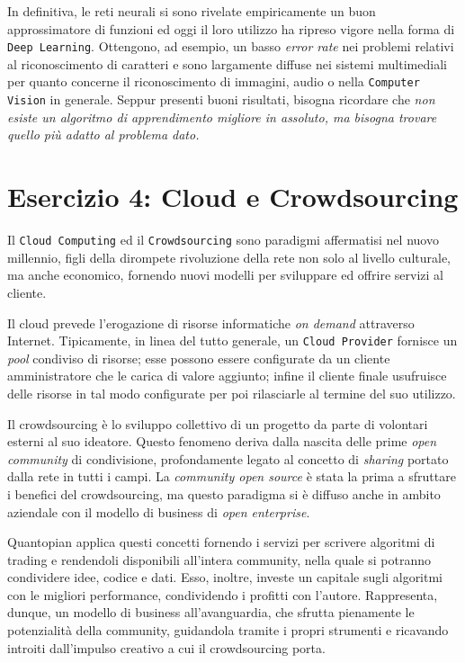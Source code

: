 			In definitiva, le reti neurali si sono rivelate empiricamente un buon approssimatore di funzioni ed oggi il loro utilizzo ha ripreso vigore nella forma di \texttt{Deep Learning}. Ottengono, ad esempio, un basso \emph{error rate} nei problemi relativi al riconoscimento di caratteri e sono largamente diffuse nei sistemi multimediali per quanto concerne il riconoscimento di immagini, audio o nella \texttt{Computer Vision} in generale. Seppur presenti buoni risultati, bisogna ricordare che \emph{non esiste un algoritmo di apprendimento migliore in assoluto, ma bisogna trovare quello più adatto al problema dato.}
			
		\section{Esercizio 4: Cloud e Crowdsourcing}
			\label{sec:es4}
			Il \texttt{Cloud Computing} ed il \texttt{Crowdsourcing} sono paradigmi affermatisi nel nuovo millennio, figli della dirompete rivoluzione della rete non solo al livello culturale, ma anche economico, fornendo nuovi modelli per sviluppare ed offrire servizi al cliente.\par
			Il cloud prevede l'erogazione di risorse informatiche \emph{on demand} attraverso Internet. Tipicamente, in linea del tutto generale, un \texttt{Cloud Provider} fornisce un \emph{pool} condiviso di risorse; esse possono essere configurate da un cliente amministratore che le carica di valore aggiunto; infine il cliente finale usufruisce delle risorse in tal modo configurate per poi rilasciarle al termine del suo utilizzo.\par
			Il crowdsourcing è lo sviluppo collettivo di un progetto da parte di volontari esterni al suo ideatore. Questo fenomeno deriva dalla nascita delle prime \emph{open community} di condivisione, profondamente legato al concetto di \emph{sharing} portato dalla rete  in tutti i campi. La \emph{community open source} è stata la prima a sfruttare i benefici del crowdsourcing, ma questo paradigma si è diffuso anche in ambito aziendale con il modello di business di \emph{open enterprise}.\par
			Quantopian applica questi concetti fornendo i servizi per scrivere algoritmi di trading e rendendoli disponibili all'intera community, nella quale si potranno condividere idee, codice e dati. Esso, inoltre, investe un capitale sugli algoritmi con le migliori performance, condividendo i profitti con l'autore. Rappresenta, dunque, un modello di business all'avanguardia, che sfrutta pienamente le potenzialità della community, guidandola tramite i propri strumenti e ricavando introiti dall'impulso creativo a cui il crowdsourcing porta.
